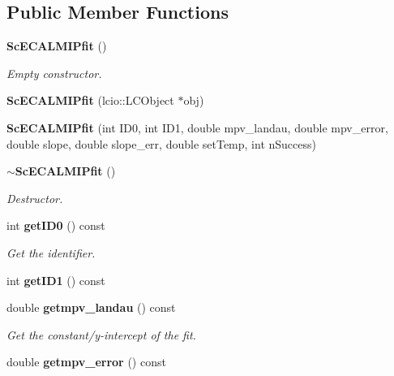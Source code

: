 \subsection*{Public Member Functions}
\begin{DoxyCompactItemize}
\item 
{\bf Sc\-E\-C\-A\-L\-M\-I\-Pfit} ()\label{classCALICE_1_1ScECALMIPfit_a26510de92557f5e3c85ff4ed4d9fa708}

\begin{DoxyCompactList}\small\item\em Empty constructor. \end{DoxyCompactList}\item 
{\bfseries Sc\-E\-C\-A\-L\-M\-I\-Pfit} (lcio\-::\-L\-C\-Object $\ast$obj)\label{classCALICE_1_1ScECALMIPfit_acd5b5a6ed9c6f9adcce0f9cc9057578e}

\item 
{\bfseries Sc\-E\-C\-A\-L\-M\-I\-Pfit} (int I\-D0, int I\-D1, double mpv\-\_\-landau, double mpv\-\_\-error, double slope, double slope\-\_\-err, double set\-Temp, int n\-Success)\label{classCALICE_1_1ScECALMIPfit_a5efbc5b0fc0f418b071ec5ab079a0c3e}

\item 
{\bf $\sim$\-Sc\-E\-C\-A\-L\-M\-I\-Pfit} ()\label{classCALICE_1_1ScECALMIPfit_a6bab7edeb418297587dc05912acf23b9}

\begin{DoxyCompactList}\small\item\em Destructor. \end{DoxyCompactList}\item 
int {\bf get\-I\-D0} () const \label{classCALICE_1_1ScECALMIPfit_a506aa0f2441e5bbf73c185aa0440c74e}

\begin{DoxyCompactList}\small\item\em Get the identifier. \end{DoxyCompactList}\item 
int {\bfseries get\-I\-D1} () const \label{classCALICE_1_1ScECALMIPfit_a0adbccb9d5c58f59550d210cf57b85ff}

\item 
double {\bf getmpv\-\_\-landau} () const \label{classCALICE_1_1ScECALMIPfit_a4ffa4a583185a6fb9616ce1a23be8040}

\begin{DoxyCompactList}\small\item\em Get the constant/y-\/intercept of the fit. \end{DoxyCompactList}\item 
double {\bf getmpv\-\_\-error} () const \label{classCALICE_1_1ScECALMIPfit_a849b6783d79e988cdf5f46b3502aedb2}


\end{DoxyCompactItemize}
